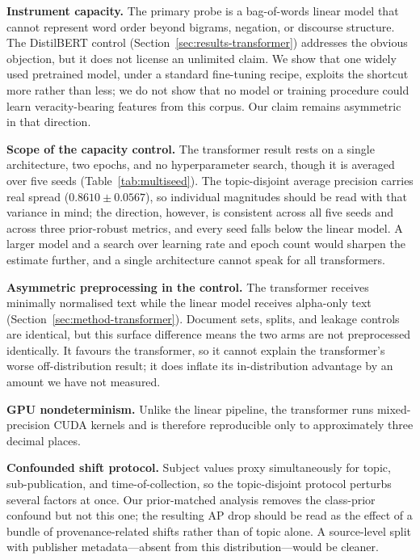 \documentclass[conference]{IEEEtran}
\begin{document}
\textbf{Instrument capacity.} The primary probe is a bag-of-words linear model
that cannot represent word order beyond bigrams, negation, or discourse
structure. The DistilBERT control (Section~\ref{sec:results-transformer})
addresses the obvious objection, but it does not license an unlimited claim. We
show that one widely used pretrained model, under a standard fine-tuning recipe,
exploits the shortcut more rather than less; we do not show that no model or
training procedure could learn veracity-bearing features from this corpus. Our
claim remains asymmetric in that direction.

\textbf{Scope of the capacity control.} The transformer result rests on a single
architecture, two epochs, and no hyperparameter search, though it is averaged
over five seeds (Table~\ref{tab:multiseed}). The topic-disjoint average precision
carries real spread ($0.8610 \pm 0.0567$), so individual magnitudes should be
read with that variance in mind; the direction, however, is consistent across
all five seeds and across three prior-robust metrics, and every seed falls below
the linear model. A larger model and a search over learning rate and epoch count
would sharpen the estimate further, and a single architecture cannot speak for
all transformers.

\textbf{Asymmetric preprocessing in the control.} The transformer receives
minimally normalised text while the linear model receives alpha-only text
(Section~\ref{sec:method-transformer}). Document sets, splits, and leakage
controls are identical, but this surface difference means the two arms are not
preprocessed identically. It favours the transformer, so it cannot explain the
transformer's worse off-distribution result; it does inflate its
in-distribution advantage by an amount we have not measured.

\textbf{GPU nondeterminism.} Unlike the linear pipeline, the transformer runs
mixed-precision CUDA kernels and is therefore reproducible only to
approximately three decimal places.

\textbf{Confounded shift protocol.} Subject values proxy simultaneously for
topic, sub-publication, and time-of-collection, so the topic-disjoint protocol
perturbs several factors at once. Our prior-matched analysis removes the
class-prior confound but not this one; the resulting AP drop should be read as
the effect of a bundle of provenance-related shifts rather than of topic alone.
A source-level split with publisher metadata---absent from this
distribution---would be cleaner.
\end{document}

